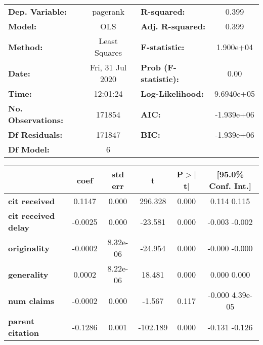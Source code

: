 \begin{center}
\begin{tabular}{lclc}
\toprule
\textbf{Dep. Variable:}     &     pagerank     & \textbf{  R-squared:         } &       0.399     \\
\textbf{Model:}             &       OLS        & \textbf{  Adj. R-squared:    } &       0.399     \\
\textbf{Method:}            &  Least Squares   & \textbf{  F-statistic:       } &   1.900e+04     \\
\textbf{Date:}              & Fri, 31 Jul 2020 & \textbf{  Prob (F-statistic):} &       0.00      \\
\textbf{Time:}              &     12:01:24     & \textbf{  Log-Likelihood:    } &   9.6940e+05    \\
\textbf{No. Observations:}  &      171854      & \textbf{  AIC:               } &   -1.939e+06    \\
\textbf{Df Residuals:}      &      171847      & \textbf{  BIC:               } &   -1.939e+06    \\
\textbf{Df Model:}          &           6      & \textbf{                     } &                 \\
\bottomrule
\end{tabular}
\begin{tabular}{lccccc}
                            & \textbf{coef} & \textbf{std err} & \textbf{t} & \textbf{P$>$$|$t$|$} & \textbf{[95.0\% Conf. Int.]}  \\
\midrule
\textbf{cit received}       &       0.1147  &        0.000     &   296.328  &         0.000        &         0.114     0.115       \\
\textbf{cit received delay} &      -0.0025  &        0.000     &   -23.581  &         0.000        &        -0.003    -0.002       \\
\textbf{originality}        &      -0.0002  &     8.32e-06     &   -24.954  &         0.000        &        -0.000    -0.000       \\
\textbf{generality}         &       0.0002  &     8.22e-06     &    18.481  &         0.000        &         0.000     0.000       \\
\textbf{num claims}         &      -0.0002  &        0.000     &    -1.567  &         0.117        &        -0.000  4.39e-05       \\
\textbf{parent citation}    &      -0.1286  &        0.001     &  -102.189  &         0.000        &        -0.131    -0.126       \\

\end{tabular}
\end{center}
